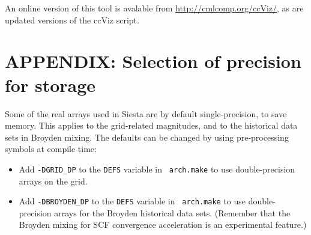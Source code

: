 \documentclass[11pt]{article}
\begin{document}
An online version of this tool is avalable from 
\url{http://cmlcomp.org/ccViz/}, as are updated versions of
the ccViz script.

\newpage
\section{APPENDIX: Selection of precision for storage}

Some of the real arrays used in Siesta are by default
single-precision, to save memory. This applies to the grid-related
magnitudes, and to the historical data sets in Broyden mixing. The
defaults can be changed by using pre-processing symbols at compile
time:

\begin{itemize}
\item Add {\tt -DGRID\_DP} to the {\tt DEFS} variable in {\tt
  arch.make} to use double-precision arrays on the grid.
\item Add {\tt -DBROYDEN\_DP} to the {\tt DEFS} variable in {\tt
  arch.make} to use double-precision arrays for the Broyden historical
  data sets. (Remember that the Broyden mixing for SCF convergence
  acceleration is an experimental feature.) 
\end{itemize}

\printindex
\end{document}
